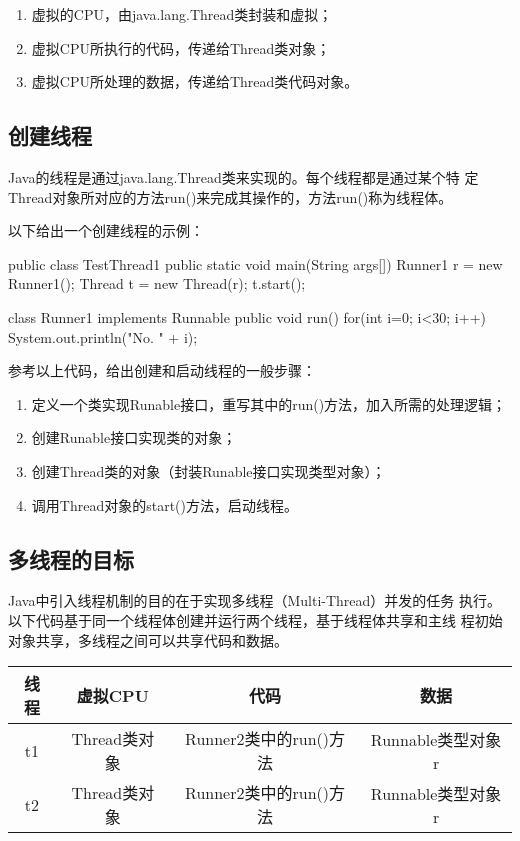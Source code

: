 \begin{enumerate}
\item 虚拟的CPU，由java.lang.Thread类封装和虚拟；
\item 虚拟CPU所执行的代码，传递给Thread类对象；
\item 虚拟CPU所处理的数据，传递给Thread类代码对象。
\end{enumerate}

\subsection{创建线程}

Java的线程是通过java.lang.Thread类来实现的。每个线程都是通过某个特
定Thread对象所对应的方法run()来完成其操作的，方法run()称为线程体。

以下给出一个创建线程的示例：


\begin{javaCode}
public class TestThread1 {
  public static void main(String args[]) {
    Runner1 r = new Runner1();
    Thread t = new Thread(r);
    t.start();
  }
}

class Runner1 implements Runnable {
  public void run() {
    for(int i=0; i<30; i++) {
      System.out.println("No. " + i);
    }
  }
}
\end{javaCode}

参考以上代码，给出创建和启动线程的一般步骤：

\begin{enumerate}
\item 定义一个类实现Runable接口，重写其中的run()方法，加入所需的处理逻辑；
\item 创建Runable接口实现类的对象；
\item 创建Thread类的对象（封装Runable接口实现类型对象）；
\item 调用Thread对象的start()方法，启动线程。
\end{enumerate}

\subsection{多线程的目标}

Java中引入线程机制的目的在于实现{\hei 多线程（Multi-Thread）}并发的任务
执行。以下代码基于同一个线程体创建并运行两个线程，基于线程体共享和主线
程初始对象共享，多线程之间可以共享代码和数据。

\begin{table}[!htbp]
\centering
\begin{tabular}{|c|c|c|c|}
  \hline
  {\bf 线程} & {\bf 虚拟CPU} & {\bf 代码} & {\bf 数据} \\
  \hline
  t1 & Thread类对象 & Runner2类中的run()方法 & Runnable类型对象r \\
  \hline
  t2 & Thread类对象 & Runner2类中的run()方法 & Runnable类型对象r \\
  \hline
\end{tabular}
\end{table}

